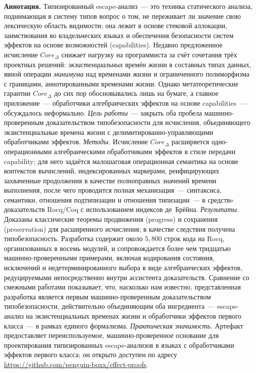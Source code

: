 \documentclass[12pt,a4paper]{article}
\begin{document}
    \vspace{0.5em}
    \noindent\textbf{Аннотация.}
    Типизированный escape-анализ~--- это техника статического анализа, поднимающая в систему
    типов вопрос о том, не переживает ли значение свою лексическую область видимости;
    она лежит в основе стековой аллокации, заимствования во владельческих языках и обеспечения
    безопасности систем эффектов на основе возможностей (capabilities).
    Недавно предложенное исчисление $Core_\Delta$ снижает нагрузку на программиста за счёт
    сочетания трёх проектных решений: \emph{экзистенциальных} времён жизни в составных типах
    данных, явной операции \emph{минимума} над временами жизни и ограниченного полиморфизма с
    границами, аннотированными временами жизни.
    Однако метатеоретические гарантии $Core_\Delta$ до сих пор обосновывались лишь на бумаге,
    а главное приложение~--- обработчики алгебраических эффектов на основе capabilities~---
    обсуждалось неформально.
    \emph{Цель работы}~--- закрыть оба пробела машинно-проверенным доказательством
    типобезопасности для исчисления, объединяющего экзистенциальные времена жизни с
    делимитированно-управляющими обработчиками эффектов.
    \emph{Методы.}
    Исчисление $Core_\Delta$ расширяется одно-операционными алгебраическими обработчиками
    эффектов в стиле передачи capability; для него задаётся малошаговая операционная семантика
    на основе контекстов вычислений, индексированных маркерами, реифицирующих захваченные
    продолжения в качестве полноправных значений времени выполнения, после чего проводится полная
    механизация~--- синтаксиса, семантики, отношения подтипизации и отношения типизации~--- в
    средствe доказательств Rocq/Coq с использованием индексов де~Брёйна.
    \emph{Результаты.}
    Доказаны классические теоремы продвижения (progress) и сохранения (preservation) для
    расширенного исчисления; в качестве следствия получена типобезопасность.
    Разработка содержит около $5{,}800$ строк кода на Rocq, организованных в восемь модулей,
    и сопровождается более чем тридцатью машинно-проверенными примерами, включая кодирования
    состояния, исключений и недетерминированного выбора в виде алгебраических эффектов,
    редуцируемыми непосредственно внутри ассистента доказательств.
    Сравнение со смежными работами показывает, что, насколько нам известно, представленная
    разработка является первым машинно-проверенным доказательством типобезопасности,
    действительно объединяющим оба ингредиента~--- escape-анализ на экзистенциальных временах
    жизни и обработчики эффектов первого класса~--- в рамках единого формализма.
    \emph{Практическая значимость.}
    Артефакт предоставляет переиспользуемое, машинно-проверенное основание для проектирования
    типизированных escape-анализов в языках с обработчиками эффектов первого класса; он
    открыто доступен по адресу \url{https://github.com/penguin-boxx/effect-proofs}.
\end{document}

